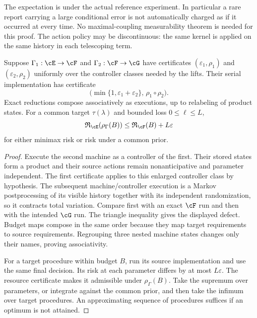 The expectation is under the actual reference experiment. In particular a
rare report carrying a large conditional error is not automatically charged
as if it occurred at every time. No maximal-coupling measurability theorem is
needed for this proof. The action policy may be discontinuous: the same
kernel is applied on the same history in each telescoping term.

\begin{theorem}\label{thm:composition}
Suppose $\Gamma_1:\cE\to\cF$ and $\Gamma_2:\cF\to\cG$ have
certificates $(\varepsilon_1,\rho_1)$ and
$(\varepsilon_2,\rho_2)$ uniformly over the controller classes needed by
the lifts. Their serial implementation has certificate
\[
 \bigl(\min\{1,\varepsilon_1+\varepsilon_2\},\,
       \rho_1\circ\rho_2\bigr).
\]
Exact reductions compose associatively as executions, up to relabeling of
product states. For a common target $\tau(\lambda)$ and bounded loss
$0\le\ell\le L$,
\begin{equation}\label{eq:risk-transfer}
 \mathfrak R_{\cE}(\rho_\Gamma(B))
 \le \mathfrak R_{\cF}(B)+L\varepsilon
\end{equation}
for either minimax risk or risk under a common prior.
\end{theorem}
\begin{proof}
Execute the second machine as a controller of the first. Their stored
states form a product and their source actions remain nonanticipative and
parameter independent. The first certificate applies to this enlarged
controller class by hypothesis. The subsequent machine/controller
execution is a Markov postprocessing of its visible history together with
its independent randomization, so it contracts total variation. Compare
first with an exact $\cF$ run and then with the intended $\cG$ run. The
triangle inequality gives the displayed defect. Budget maps compose in the
same order because they map target requirements to source requirements.
Regrouping three nested machine states changes only their names, proving
associativity.

For a target procedure within budget $B$, run its source implementation
and use the same final decision. Its risk at each parameter differs by at
most $L\varepsilon$. The resource certificate makes it admissible under
$\rho_\Gamma(B)$. Take the supremum over parameters, or integrate against
the common prior, and then take the infimum over target procedures. An
approximating sequence of procedures suffices if an optimum is not attained.
\end{proof}

